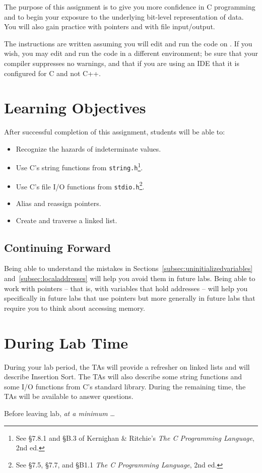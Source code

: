 The purpose of this assignment is to give you more confidence in C programming and to begin your exposure to the underlying bit-level representation of data.
You will also gain practice with pointers and with file input/output.

The instructions are written assuming you will edit and run the code on \runtimeenvironment.
If you wish, you may edit and run the code in a different environment;
be sure that your compiler suppresses no warnings, and that if you are using an IDE that it is configured for C and not C++.

\section*{Learning Objectives}

After successful completion of this assignment, students will be able to:
\begin{itemize}
    \item Recognize the hazards of indeterminate values.
    \item Use C's string functions from \lstinline{string.h}\footnote{See \S7.8.1 and \S{}B.3 of Kernighan \& Ritchie's \textit{The C Programming Language}, 2nd ed.}.
    \item Use C's file I/O functions from \lstinline{stdio.h}\footnote{See \S7.5, \S7.7, and \S{}B1.1 \textit{The C Programming Language}, 2nd ed.}.
    \item Alias and reassign pointers.
    \item Create and traverse a linked list.
\end{itemize}

\subsection*{Continuing Forward}

Being able to understand the mistakes in Sections~\ref{subsec:uninitializedvariables} and~\ref{subsec:localaddresses} will help you avoid them in future labs.
Being able to work with pointers -- that is, with variables that hold addresses -- will help you specifically in future labs that use pointers but more generally in future labs that require you to think about accessing memory.

\section*{During Lab Time}

During your lab period, the TAs will provide a refresher on linked lists and will describe Insertion Sort.
The TAs will also describe some string functions and some I/O functions from C's standard library.
During the remaining time, the TAs will be available to answer questions.

Before leaving lab, \textit{at a minimum} \dots
